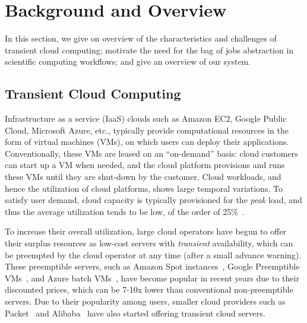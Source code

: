 \section{Background and Overview}

In this section, we give on overview of the characteristics and challenges of transient cloud computing; motivate the need for the bag of jobs abstraction in scientific computing workflows; and give an overview of our \sysname system. 


\subsection{Transient Cloud Computing}

Infrastructure as a service (IaaS) clouds such as Amazon EC2, Google Public Cloud, Microsoft Azure, etc., typically provide computational resources in the form of virtual machines (VMs), on which users can deploy their applications.
Conventionally, these VMs are leased on an ``on-demand'' basis: cloud customers can start up a VM when needed, and the cloud platform provisions and runs these VMs until they are shut-down by the customer. 
Cloud workloads, and hence the utilization of cloud platforms, shows large temporal variations.  
To satisfy user demand, cloud capacity is typically provisioned for the \emph{peak} load, and thus the average utilization tends to be low, of the order of 25\%~\cite{borg,resource-central-sosp17}. 


To increase their overall utilization, large cloud operators have begun to offer their surplus resources as low-cost servers with \emph{transient} availability, which can be preempted by the cloud operator at any time (after a small advance warning). 
These preemptible servers, such as Amazon Spot instances~\cite{spot-web}, Google Preemptible VMs~\cite{preemptible}, and Azure batch VMs~\cite{azure-batch}, have become popular in recent years due to their discounted prices, which can be 7-10x lower than conventional non-preemptible servers. 
Due to their popularity among users, smaller cloud providers such as Packet~\cite{packet-spot} and Alibaba~\cite{alibaba-spot} have also started offering transient cloud servers. 

